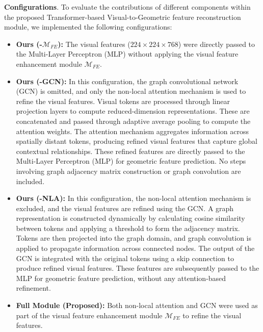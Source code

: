 \textbf{Configurations}. To evaluate the contributions of different components within the proposed Transformer-based Visual-to-Geometric feature reconstruction module, we implemented the following configurations:
\begin{itemize}
    \item \textbf{Ours (-$\mathcal{M}_{FE}$):} The visual features ($224 \times 224 \times 768$) were directly passed to the Multi-Layer Perceptron (MLP) without applying the visual feature enhancement module $\mathcal{M}_{FE}$.
    \item \textbf{Ours (-GCN):} In this configuration, the graph convolutional network (GCN) is omitted, and only the non-local attention mechanism is used to refine the visual features. Visual tokens are processed through linear projection layers to compute reduced-dimension representations. These are concatenated and passed through adaptive average pooling to compute the attention weights. The attention mechanism aggregates information across spatially distant tokens, producing refined visual features that capture global contextual relationships. These refined features are directly passed to the Multi-Layer Perceptron (MLP) for geometric feature prediction. No steps involving graph adjacency matrix construction or graph convolution are included.
    \item \textbf{Ours (-NLA):} In this configuration, the non-local attention mechanism is excluded, and the visual features are refined using the GCN. A graph representation is constructed dynamically by calculating cosine similarity between tokens and applying a threshold to form the adjacency matrix. Tokens are then projected into the graph domain, and graph convolution is applied to propagate information across connected nodes. The output of the GCN is integrated with the original tokens using a skip connection to produce refined visual features. These features are subsequently passed to the MLP for geometric feature prediction, without any attention-based refinement.
    \item \textbf{Full Module (Proposed):} Both non-local attention and GCN were used as part of the visual feature enhancement module $\mathcal{M}_{FE}$ to refine the visual features.
\end{itemize}

